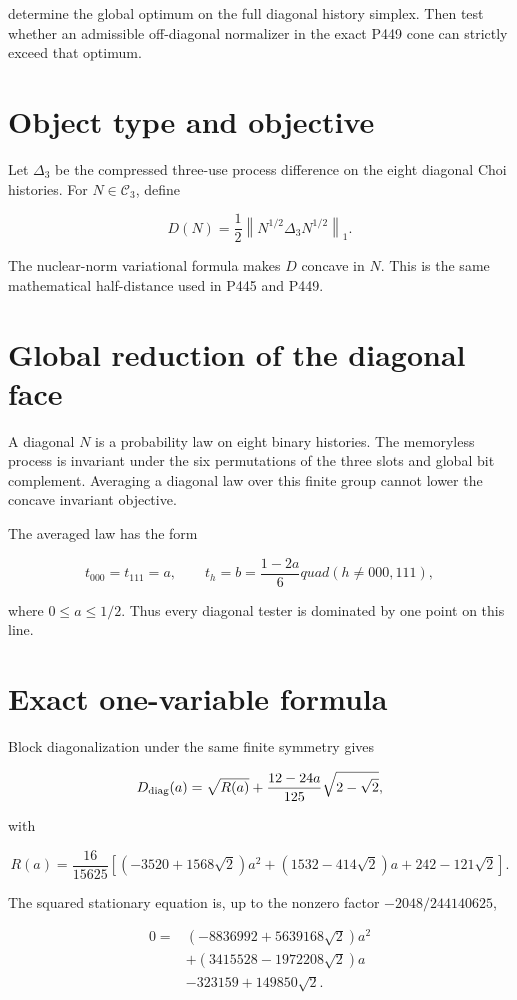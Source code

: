 \documentclass[11pt,a4paper,openany]{report}
\begin{document}
determine the global optimum on the full diagonal history simplex. Then test whether an admissible off-diagonal normalizer in the exact P449 cone can strictly exceed that optimum.

\section{Object type and objective}

Let \(\Delta_3\) be the compressed three-use process difference on the eight diagonal Choi histories. For \(N\in\mathcal C_3\), define

\[
D(N)=\frac12\left\lVert
N^{1/2}\Delta_3N^{1/2}
\right\rVert_1.
\]

The nuclear-norm variational formula makes \(D\) concave in \(N\). This is the same mathematical half-distance used in P445 and P449.

\section{Global reduction of the diagonal face}

A diagonal \(N\) is a probability law on eight binary histories. The memoryless process is invariant under the six permutations of the three slots and global bit complement. Averaging a diagonal law over this finite group cannot lower the concave invariant objective.

The averaged law has the form

\[
t_{000}=t_{111}=a,
\qquad
t_h=b=\frac{1-2a}{6}quad
(h\ne000,111),
\]

where \(0\le a\le1/2\). Thus every diagonal tester is dominated by one point on this line.

\section{Exact one-variable formula}

Block diagonalization under the same finite symmetry gives

\[
D_{\rm diag}(a)=\sqrt{R(a)}+
\frac{12-24a}{125}\sqrt{2-\sqrt2},
\]

with

\[
R(a)=\frac{16}{15625}
\left[
(-3520+1568\sqrt2)a^2
+(1532-414\sqrt2)a
+242-121\sqrt2
\right].
\]

The squared stationary equation is, up to the nonzero factor \(-2048/244140625\),

\[
\begin{aligned}
0={}&(-8836992+5639168\sqrt2)a^2\\
&+(3415528-1972208\sqrt2)a\\
&-323159+149850\sqrt2.
\end{aligned}
\]
\end{document}
